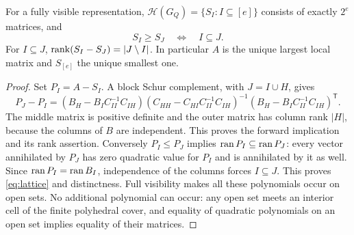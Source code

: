 \begin{lemma}\label{lem:lattice}
For a fully visible representation, $\mathcal H(G_Q)=\{S_I:I\subseteq[e]\}$ consists of exactly $2^e$ matrices, and
\begin{equation}\label{eq:lattice}
 S_I\ge S_J\quad\Longleftrightarrow\quad I\subseteq J.
\end{equation}
For $I\subseteq J$, $\operatorname{rank}(S_I-S_J)=|J\setminus I|$. In particular $A$ is the unique largest local matrix and $S_{[e]}$ the unique smallest one.
\end{lemma}
\begin{proof}
Set $P_I=A-S_I$. A block Schur complement, with $J=I\cup H$, gives
\[
 P_J-P_I=(B_H-B_IC_{II}^{-1}C_{IH})
 (C_{HH}-C_{HI}C_{II}^{-1}C_{IH})^{-1}
 (B_H-B_IC_{II}^{-1}C_{IH})^{\mathsf T}.
\]
The middle matrix is positive definite and the outer matrix has column rank $|H|$, because the columns of $B$ are independent. This proves the forward implication and its rank assertion. Conversely $P_I\le P_J$ implies $\operatorname{ran} P_I\subseteq\operatorname{ran} P_J$: every vector annihilated by $P_J$ has zero quadratic value for $P_I$ and is annihilated by it as well. Since $\operatorname{ran} P_I=\operatorname{ran} B_I$, independence of the columns forces $I\subseteq J$. This proves \eqref{eq:lattice} and distinctness. Full visibility makes all these polynomials occur on open sets. No additional polynomial can occur: any open set meets an interior cell of the finite polyhedral cover, and equality of quadratic polynomials on an open set implies equality of their matrices.
\end{proof}

